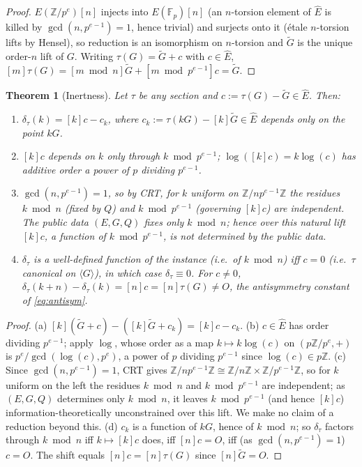\documentclass[11pt]{article}
\newtheorem{theorem}{Theorem}
\theoremstyle{definition}
\newcommand{\Fp}{\mathbb{F}_p}
\newcommand{\Z}{\mathbb{Z}}
\newcommand{\Ehat}{\widehat{E}}
\begin{document}
\begin{proof}
$E(\Z/p^e)[n]$ injects into $E(\Fp)[n]$ (an $n$-torsion element of
$\Ehat$ is killed by $\gcd(n,p^{e-1})=1$, hence trivial) and surjects
onto it (étale $n$-torsion lifts by Hensel), so reduction is an
isomorphism on $n$-torsion and $\widetilde G$ is the unique order-$n$
lift of $G$. Writing $\tau(G)=\widetilde G+c$ with $c\in\Ehat$,
$[m]\tau(G)=[m\bmod n]\widetilde G+[m\bmod p^{e-1}]c=\widetilde G$.
\end{proof}

\begin{theorem}[Inertness]\label{thm:main}
Let $\tau$ be any section and $c:=\tau(G)-\widetilde G\in\Ehat$. Then:
\begin{enumerate}
\item[(a)] $\delta_\tau(k)=[k]c-c_k$, where $c_k:=\tau(kG)-[k]\widetilde G
\in\Ehat$ depends only on the point $kG$.
\item[(b)] $[k]c$ depends on $k$ only through $k\bmod p^{e-1}$;
$\log([k]c)=k\log(c)$ has additive order a power of $p$ dividing
$p^{e-1}$.
\item[(c)] $\gcd(n,p^{e-1})=1$, so by CRT, for $k$ uniform on
$\Z/np^{e-1}\Z$ the residues $k\bmod n$ (fixed by $Q$) and $k\bmod
p^{e-1}$ (governing $[k]c$) are independent. The public data $(E,G,Q)$
fixes only $k\bmod n$; hence over this natural lift $[k]c$, a function of
$k\bmod p^{e-1}$, is not determined by the public data.
\item[(d)] $\delta_\tau$ is a well-defined function of the instance
(i.e.\ of $k\bmod n$) iff $c=0$ (i.e.\ $\tau$ canonical on
$\langle G\rangle$), in which case $\delta_\tau\equiv 0$. For $c\neq 0$,
$\delta_\tau(k+n)-\delta_\tau(k)=[n]c=[n]\tau(G)\neq O$, the antisymmetry
constant of \eqref{eq:antisym}.
\end{enumerate}
\end{theorem}

\begin{proof}
(a) $[k](\widetilde G+c)-([k]\widetilde G+c_k)=[k]c-c_k$. (b) $c\in\Ehat$
has order dividing $p^{e-1}$; apply $\log$, whose order as a map
$k\mapsto k\log(c)$ on $(p\Z/p^e,+)$ is $p^e/\gcd(\log(c),p^e)$, a power
of $p$ dividing $p^{e-1}$ since $\log(c)\in p\Z$. (c) Since
$\gcd(n,p^{e-1})=1$, CRT gives $\Z/np^{e-1}\Z\cong\Z/n\Z\times\Z/p^{e-1}\Z$,
so for $k$ uniform on the left the residues $k\bmod n$ and $k\bmod
p^{e-1}$ are independent; as $(E,G,Q)$ determines only $k\bmod n$, it
leaves $k\bmod p^{e-1}$ (and hence $[k]c$) information-theoretically
unconstrained over this lift. We make no claim of a reduction beyond
this. (d) $c_k$ is a function of $kG$, hence of
$k\bmod n$; so $\delta_\tau$ factors through $k\bmod n$ iff
$k\mapsto[k]c$ does, iff $[n]c=O$, iff (as $\gcd(n,p^{e-1})=1$) $c=O$. The
shift equals $[n]c=[n]\tau(G)$ since $[n]\widetilde G=O$.
\end{proof}
\end{document}
